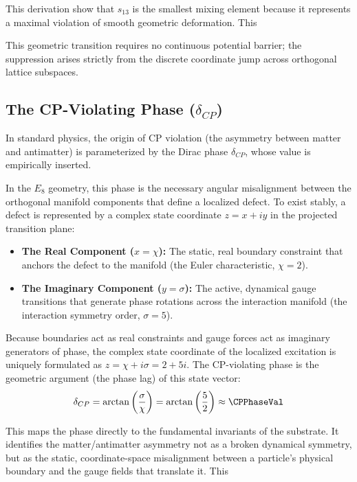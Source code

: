 This derivation show that $s_{13}$ is the smallest mixing element because it represents a maximal violation of smooth geometric deformation. This \sThirteenAccText

This geometric transition requires no continuous potential barrier; the suppression arises strictly from the discrete coordinate jump across orthogonal lattice subspaces.

\subsection{The CP-Violating Phase (\texorpdfstring{$\delta_{CP}$}{delta CP})}

In standard physics, the origin of CP violation (the asymmetry between matter and antimatter) is parameterized by the Dirac phase $\delta_{CP}$, whose value is empirically inserted.

In the $E_8$ geometry, this phase is the necessary angular misalignment between the orthogonal manifold components that define a localized defect. To exist stably, a defect is represented by a complex state coordinate $z = x + iy$ in the projected transition plane:
\begin{itemize}
    \item \textbf{The Real Component ($x = \chi$):} The static, real boundary constraint that anchors the defect to the manifold (the Euler characteristic, $\chi = 2$).
    \item \textbf{The Imaginary Component ($y = \sigma$):} The active, dynamical gauge transitions that generate phase rotations across the interaction manifold (the interaction symmetry order, $\sigma = 5$).
\end{itemize}

Because boundaries act as real constraints and gauge forces act as imaginary generators of phase, the complex state coordinate of the localized excitation is uniquely formulated as $z = \chi + i\sigma = 2 + 5i$. The CP-violating phase is the geometric argument (the phase lag) of this state vector:
\begin{equation}
    \delta_{CP} = \arctan\left(\frac{\sigma}{\chi}\right) = \arctan\left(\frac{5}{2}\right) \approx \CPPhaseVal
\end{equation}

This maps the phase directly to the fundamental invariants of the substrate. It identifies the matter/antimatter asymmetry not as a broken dynamical symmetry, but as the static, coordinate-space misalignment between a particle's physical boundary and the gauge fields that translate it. This \CPPhaseAccText

